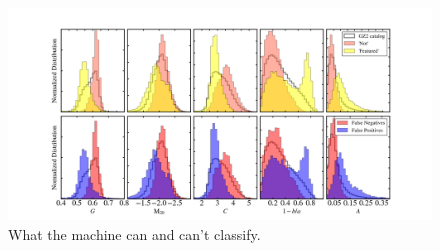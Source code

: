 \documentclass[twocolumn]{aastex6}
\begin{document}
\begin{figure}[t!]
\centering
\includegraphics[width=7in]{figures/GZ2_sup_PLPD5_p5_flipfeature2b_RF_accuracy_redo_raw_combo_morph_params_raw_labels_4paper.png}
\caption{What the machine can and can't classify. \label{fig: morph params}}
\end{figure}



\end{document}
